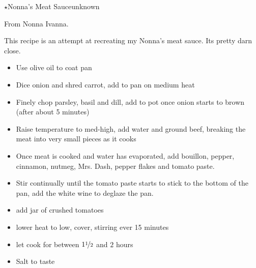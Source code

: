 \begin{recipe}{\texorpdfstring{$\star$}{str}Nonna's Meat Sauce}{unknown}{}

    \freeform From Nonna Ivanna.


    This recipe is an attempt at recreating my Nonna's meat sauce. Its pretty darn close.

    \begin{itemize}
        \item Use olive oil to coat pan
        \item Dice onion and shred carrot, add to pan on medium heat
        \item Finely chop parsley, basil and dill, add to pot once onion starts to brown (after about 5 minutes)
        \item Raise temperature to med-high, add water and ground beef, breaking the meat into very small pieces as it cooks
        \item Once meat is cooked and water has evaporated, add bouillon, pepper, cinnamon, nutmeg, Mrs. Dash, pepper flakes and tomato paste.
        \item Stir continually until the tomato paste starts to stick to the bottom of the pan, add the white wine to deglaze the pan.
        \item add jar of crushed tomatoes
        \item lower heat to low, cover, stirring ever 15 minutes
        \item let cook for between $1\nicefrac{1}{2}$ and $2$ hours
        \item Salt to taste
    \end{itemize}
\end{recipe}